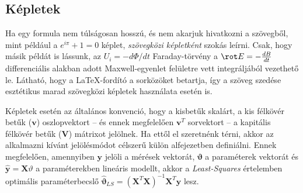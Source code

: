 \subsection{Képletek}
Ha egy formula nem túlságosan hosszú, és nem akarjuk hivatkozni a szövegből, mint például a $e^{i\pi}+1=0$ képlet, \emph{szövegközi képletként} szokás leírni. Csak, hogy másik példát is lássunk, az $U_i=-d\Phi/dt$ Faraday-törvény a $\rot E=-\frac{dB}{dt}$ differenciális alakban adott Maxwell-egyenlet felületre vett integráljából vezethető le. Látható, hogy a \LaTeX-fordító a sorközöket betartja, így a szöveg szedése esztétikus marad szövegközi képletek használata esetén is.

Képletek esetén az általános konvenció, hogy a kisbetűk skalárt, a kis félkövér betűk ($\mathbf{v}$) oszlopvektort -- és ennek megfelelően $\mathbf{v}^T$ sorvektort -- a kapitális félkövér betűk ($\mathbf{V}$) mátrixot jelölnek. Ha ettől el szeretnénk térni, akkor az alkalmazni kívánt jelölésmódot célszerű külön alfejezetben definiálni. Ennek megfelelően, amennyiben $\mathbf{y}$ jelöli a mérések vektorát, $\mathbf{\vartheta}$ a paraméterek vektorát és $\hat{\mathbf{y}}=\mathbf{X}\vartheta$ a paraméterekben lineáris modellt, akkor a \emph{Least-Squares} értelemben optimális paraméterbecslő $\hat{\mathbf{\vartheta}}_{LS}=(\mathbf{X}^T\mathbf{X})^{-1}\mathbf{X}^T\mathbf{y}$ lesz.

